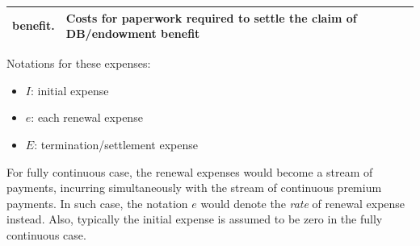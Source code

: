 \begin{enumerate}
\begin{itemize}
\begin{center}
\begin{tabular}{lp{5cm}p{5cm}}
benefit.&Costs for paperwork required to settle the claim of DB/endowment benefit \\
\bottomrule
\end{tabular}
\end{center}
Notations for these expenses:
\begin{itemize}
\item \(I\): initial expense
\item \(e\): each renewal expense
\item \(E\): termination/settlement expense
\end{itemize}
\begin{note}
For fully continuous case, the renewal expenses would become a stream of
payments, incurring simultaneously with the stream of continuous premium
payments. In such case, the notation \(e\) would denote the \emph{rate} of
renewal expense instead. Also, typically the initial expense is assumed to be
zero in the fully continuous case.


\end{note}
\end{itemize}
\end{enumerate}
